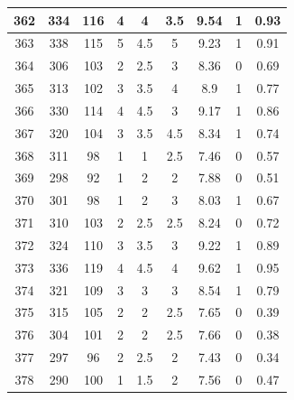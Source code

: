 \documentclass[11pt]{article}
\begin{document}
\begin{appendix}
\begin{longtable}[H]{|c|c|c|c|c|c|c|c|c|}
	362        & 334       & 116         & 4                 & 4   & 3.5 & 9.54 & 1        & 0.93            \\ \hline
	363        & 338       & 115         & 5                 & 4.5 & 5   & 9.23 & 1        & 0.91            \\ \hline
	364        & 306       & 103         & 2                 & 2.5 & 3   & 8.36 & 0        & 0.69            \\ \hline
	365        & 313       & 102         & 3                 & 3.5 & 4   & 8.9  & 1        & 0.77            \\ \hline
	366        & 330       & 114         & 4                 & 4.5 & 3   & 9.17 & 1        & 0.86            \\ \hline
	367        & 320       & 104         & 3                 & 3.5 & 4.5 & 8.34 & 1        & 0.74            \\ \hline
	368        & 311       & 98          & 1                 & 1   & 2.5 & 7.46 & 0        & 0.57            \\ \hline
	369        & 298       & 92          & 1                 & 2   & 2   & 7.88 & 0        & 0.51            \\ \hline
	370        & 301       & 98          & 1                 & 2   & 3   & 8.03 & 1        & 0.67            \\ \hline
	371        & 310       & 103         & 2                 & 2.5 & 2.5 & 8.24 & 0        & 0.72            \\ \hline
	372        & 324       & 110         & 3                 & 3.5 & 3   & 9.22 & 1        & 0.89            \\ \hline
	373        & 336       & 119         & 4                 & 4.5 & 4   & 9.62 & 1        & 0.95            \\ \hline
	374        & 321       & 109         & 3                 & 3   & 3   & 8.54 & 1        & 0.79            \\ \hline
	375        & 315       & 105         & 2                 & 2   & 2.5 & 7.65 & 0        & 0.39            \\ \hline
	376        & 304       & 101         & 2                 & 2   & 2.5 & 7.66 & 0        & 0.38            \\ \hline
	377        & 297       & 96          & 2                 & 2.5 & 2   & 7.43 & 0        & 0.34            \\ \hline
	378        & 290       & 100         & 1                 & 1.5 & 2   & 7.56 & 0        & 0.47            \\ \hline

\end{longtable}
\end{appendix}
\end{document}
